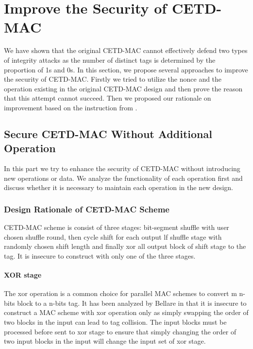 \section{Improve the Security of CETD-MAC}
We have shown that the original CETD-MAC cannot effectively defend two types of integrity attacks as the number of distinct tags is determined by the proportion of 1s and 0s. In this section, we propose several approaches to improve the security of CETD-MAC. Firstly we tried to utilize the nonce and the operation existing in the original CETD-MAC design and then prove the reason that this attempt cannot succeed. Then we proposed our rationale on improvement based on the instruction from \cite{}.  
\subsection{Secure CETD-MAC Without Additional Operation}\label{sect:pattern}
In this part we try to enhance the security of CETD-MAC without introducing new operations or data. We analyze the functionality of each operation first and discuss whether it is necessary to maintain each operation in the new design.
\subsubsection{Design Rationale of CETD-MAC Scheme}
CETD-MAC scheme is consist of three stages: bit-segment shuffle with user chosen shuffle round, then cycle shift for each output lf shuffle stage with randomly chosen shift length and finally xor all output block of shift stage to the tag. It is insecure to construct with only one of the three stages.
\paragraph{XOR stage}
The xor operation is a common choice for parallel MAC schemes to convert m n-bits block to a n-bits tag. It has been analyzed by Bellare in \cite{} that it is insecure to construct a MAC scheme with xor operation only as simply swapping the order of two blocks in the input can lead to tag collision.  The input blocks must be processed before sent to xor stage to ensure that simply changing the order of two input blocks in the input will change the input set of xor stage.
